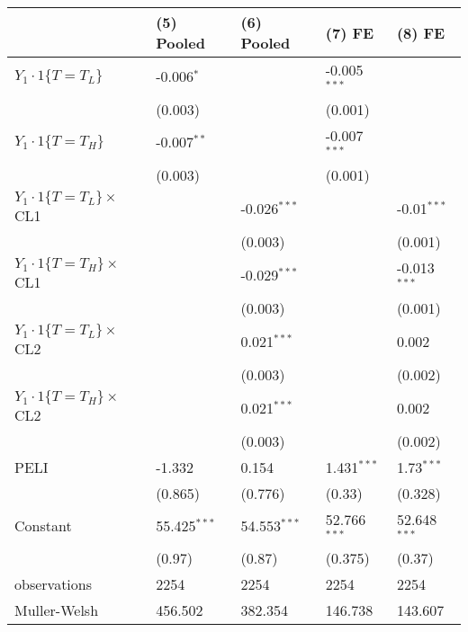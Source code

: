 \begin{tabular}{lllll}
\hline
 & (5) Pooled & (6) Pooled & (7) FE & (8) FE \\
\hline
$Y_1\cdot1\{T=T_L\}$ & -0.006$^{*}$ &  & -0.005$^{***}$ &  \\
 & (0.003) &  & (0.001) &  \\
$Y_1\cdot1\{T=T_H\}$ & -0.007$^{**}$ &  & -0.007$^{***}$ &  \\
 & (0.003) &  & (0.001) &  \\
$Y_1\cdot1\{T=T_L\}\times$CL1 &  & -0.026$^{***}$ &  & -0.01$^{***}$ \\
 &  & (0.003) &  & (0.001) \\
$Y_1\cdot1\{T=T_H\}\times$CL1 &  & -0.029$^{***}$ &  & -0.013$^{***}$ \\
 &  & (0.003) &  & (0.001) \\
$Y_1\cdot1\{T=T_L\}\times$CL2 &  & 0.021$^{***}$ &  & 0.002 \\
 &  & (0.003) &  & (0.002) \\
$Y_1\cdot1\{T=T_H\}\times$CL2 &  & 0.021$^{***}$ &  & 0.002 \\
 &  & (0.003) &  & (0.002) \\
PELI & -1.332 & 0.154 & 1.431$^{***}$ & 1.73$^{***}$ \\
 & (0.865) & (0.776) & (0.33) & (0.328) \\
Constant & 55.425$^{***}$ & 54.553$^{***}$ & 52.766$^{***}$ & 52.648$^{***}$ \\
 & (0.97) & (0.87) & (0.375) & (0.37) \\\hline

observations & 2254 & 2254 & 2254 & 2254 \\
Muller-Welsh & 456.502 & 382.354 & 146.738 & 143.607 \\
\hline
\end{tabular}
